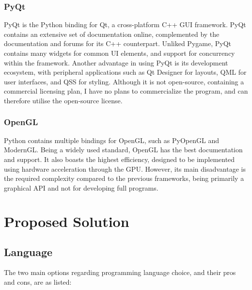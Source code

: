\documentclass[../main/main.tex]{subfiles}
\begin{document}
\subsubsection*{PyQt}
PyQt is the Python binding for Qt, a cross-platform C++ GUI framework. PyQt contains an extensive set of documentation online, complemented by the documentation and forums for its C++ counterpart. Unliked Pygame, PyQt contains many widgets for common UI elements, and support for concurrency within the framework. Another advantage in using PyQt is its development ecosystem, with peripheral applications such as Qt Designer for layouts, QML for user interfaces, and QSS for styling. Although it is not open-source, containing a commercial licensing plan, I have no plans to commercialize the program, and can therefore utilise the open-source license.

\subsubsection*{OpenGL}
Python contains multiple bindings for OpenGL, such as PyOpenGL and ModernGL. Being a widely used standard, OpenGL has the best documentation and support. It also boasts the highest efficiency, designed to be implemented using hardware acceleration through the GPU. However, its main disadvantage is the required complexity compared to the previous frameworks, being primarily a graphical API and not for developing full programs.

\section{Proposed Solution}
\subsection{Language}
The two main options regarding programming language choice, and their pros and cons, are as listed:
\end{document}
